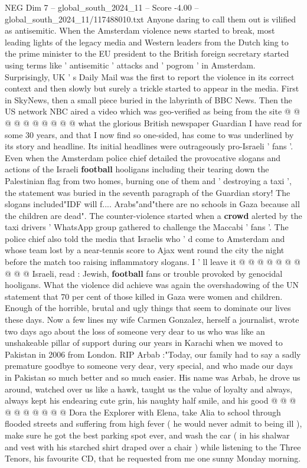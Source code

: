 \begin{textsample}{NEG Dim 7 – global\_south\_2024\_11 – Score -4.00 – global\_south\_2024\_11/117488010.txt}
Anyone daring to call them out is vilified as antisemitic.
When the Amsterdam violence news started to break, most leading lights of the legacy media and Western leaders from the Dutch king to the prime minister to the EU president to the British foreign secretary started using terms like ' antisemitic ' attacks and ' pogrom ' in Amsterdam.
Surprisingly, UK ' s Daily Mail was the first to report the violence in its correct context and then slowly but surely a trickle started to appear in the media.
First in SkyNews, then a small piece buried in the labyrinth of BBC News.
Then the US network NBC aired a video which was geo-verified as being from the site @ @ @ @ @ @ @ @ @ @ what the glorious British newspaper Guardian I have read for some 30 years, and that I now find so one-sided, has come to was underlined by its story and headline.
Its initial headlines were outrageously pro-Israeli ' fans '.
Even when the Amsterdam police chief detailed the provocative slogans and actions of the Israeli \textbf{football} hooligans including their tearing down the Palestinian flag from two homes, burning one of them and ' destroying a taxi ', the statement was buried in the seventh paragraph of the Guardian story!
The slogans included"IDF will f....
Arabs"and"there are no schools in Gaza because all the children are dead".
The counter-violence started when a \textbf{crowd} alerted by the taxi drivers ' WhatsApp group gathered to challenge the Maccabi ' fans '.
The police chief also told the media that Israelis who ' d come to Amsterdam and whose team lost by a near-tennis score to Ajax went round the city the night before the match too raising inflammatory slogans.
I ' ll leave it @ @ @ @ @ @ @ @ @ @ Israeli, read : Jewish, \textbf{football} fans or trouble provoked by genocidal hooligans.
What the violence did achieve was again the overshadowing of the UN statement that 70 per cent of those killed in Gaza were women and children.
Enough of the horrible, brutal and ugly things that seem to dominate our lives these days.
Now a few lines my wife Carmen Gonzalez, herself a journalist, wrote two days ago about the loss of someone very dear to us who was like an unshakeable pillar of support during our years in Karachi when we moved to Pakistan in 2006 from London.
RIP Arbab :"Today, our family had to say a sadly premature goodbye to someone very dear, very special, and who made our days in Pakistan so much better and so much easier.
His name was Arbab, he drove us around, watched over us like a hawk, taught us the value of loyalty and always, always kept his endearing cute grin, his naughty half smile, and his good @ @ @ @ @ @ @ @ @ @ Dora the Explorer with Elena, take Alia to school through flooded streets and suffering from high fever ( he would never admit to being ill ), make sure he got the best parking spot ever, and wash the car ( in his shalwar and vest with his starched shirt draped over a chair ) while listening to the Three Tenors, his favourite CD, that he requested from me one sunny Monday morning.

\end{textsample}
